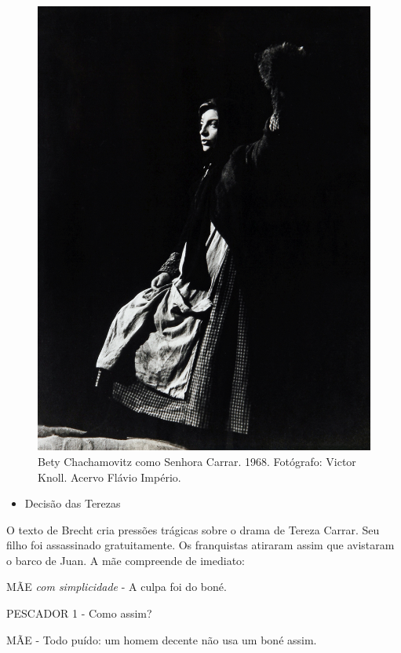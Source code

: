 \begin{figure}
\includegraphics[width=\columnwidth]{./media/IMAGEM54.png}
\caption{Bety Chachamovitz como Senhora Carrar. 1968. Fotógrafo: Victor Knoll.
Acervo Flávio Império.}
\end{figure}

\begin{itemize}
\item
  Decisão das Terezas
\end{itemize}

O texto de Brecht cria pressões trágicas sobre o drama de Tereza Carrar.
Seu filho foi assassinado gratuitamente. Os franquistas atiraram assim
que avistaram o barco de Juan. A mãe compreende de imediato:

MÃE \textit{com simplicidade} - A culpa foi do boné.

PESCADOR 1 - Como assim?

MÃE - Todo puído: um homem decente não usa um boné assim.

